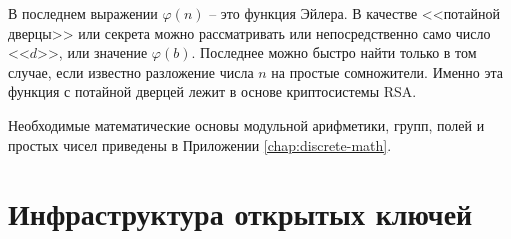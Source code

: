 В последнем выражении $\varphi \left( n \right)$ -- это функция Эйлера. В качестве <<потайной дверцы>> или секрета можно рассматривать или непосредственно само число <<$d$>>, или значение $\varphi \left( b \right)$. Последнее можно быстро найти только в том случае, если известно разложение числа $n$ на простые сомножители. Именно эта функция с потайной дверцей лежит в основе криптосистемы RSA.

Необходимые математические основы модульной арифметики, групп, полей и простых чисел приведены в Приложении \ref{chap:discrete-math}.









\section{Инфраструктура открытых ключей}\label{chapter-public-key-infrastructure}




